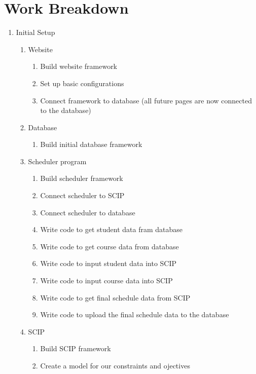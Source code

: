 \documentclass[11pt]{article}
\begin{document}
\clearpage
\section{Work Breakdown} %

\begin{enumerate}
\item Initial Setup
\begin{enumerate} 
\item Website
\begin{enumerate}
\item Build website framework
\item Set up basic configurations
\item Connect framework to database (all future pages are now connected to the database)
\end{enumerate} 
\item Database
\begin{enumerate}
\item Build initial database framework
\end{enumerate} 
\item Scheduler program
\begin{enumerate}
\item Build scheduler framework
\item Connect scheduler to SCIP
\item Connect scheduler to database
\item Write code to get student data fram database
\item Write code to get course data from database
\item Write code to input student data into SCIP
\item Write code to input course data into SCIP
\item Write code to get final schedule data from SCIP
\item Write code to upload the final schedule data to the database
\end{enumerate} 
\item SCIP
\begin{enumerate} 
\item Build SCIP framework
\item Create a model for our constraints and ojectives
\end{enumerate}
\end{enumerate}


\end{enumerate}
\end{document}
